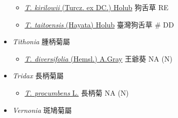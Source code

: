 \begin{itemize}
  \begin{itemize}
        \item[] \href{http://www.theplantlist.org/tpl1.1/search?q=Tephroseris+kirilowii}{\textit{T. kirilowii} (Turcz. ex DC.) Holub}   狗舌草   RE
        \item[] \href{http://www.theplantlist.org/tpl1.1/search?q=Tephroseris+taitoensis}{\textit{T. taitoensis} (Hayata) Holub}   臺灣狗舌草  \# DD
  \end{itemize}
 \item[] \textit{Tithonia} 腫柄菊屬
                                
  \begin{itemize}
        \item[] \href{http://www.theplantlist.org/tpl1.1/search?q=Tithonia+diversifolia}{\textit{T. diversifolia} (Hemsl.) A.Gray}   王爺葵   NA (N)
  \end{itemize}
 \item[] \textit{Tridax} 長柄菊屬
                                
  \begin{itemize}
        \item[] \href{http://www.theplantlist.org/tpl1.1/search?q=Tridax+procumbens}{\textit{T. procumbens} L.}   長柄菊   NA (N)
  \end{itemize}
 \item[] \textit{Vernonia} 斑鳩菊屬
                                

\end{itemize}
